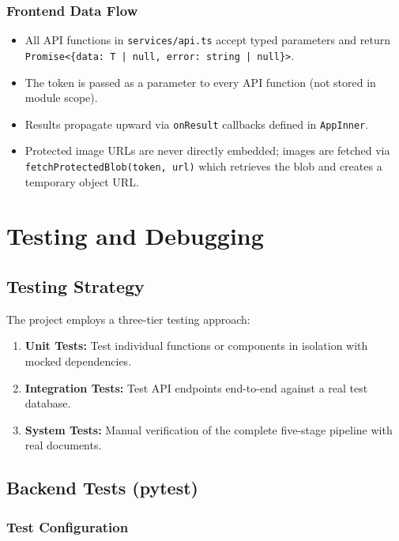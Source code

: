 \subsection{Frontend Data Flow}
\begin{itemize}
    \item All API functions in \texttt{services/api.ts} accept typed parameters and return \texttt{Promise<\{data: T | null, error: string | null\}>}.
    \item The token is passed as a parameter to every API function (not stored in module scope).
    \item Results propagate upward via \texttt{onResult} callbacks defined in \texttt{AppInner}.
    \item Protected image URLs are never directly embedded; images are fetched via \texttt{fetchProtectedBlob(token, url)} which retrieves the blob and creates a temporary object URL.
\end{itemize}

\chapter{Testing and Debugging}

\section{Testing Strategy}

The project employs a three-tier testing approach:

\begin{enumerate}
    \item \textbf{Unit Tests:} Test individual functions or components in isolation with mocked dependencies.
    \item \textbf{Integration Tests:} Test API endpoints end-to-end against a real test database.
    \item \textbf{System Tests:} Manual verification of the complete five-stage pipeline with real documents.
\end{enumerate}

\section{Backend Tests (pytest)}

\subsection{Test Configuration}

